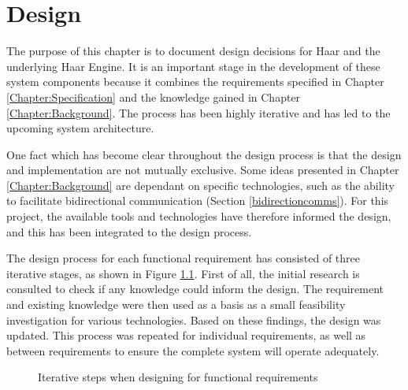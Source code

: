 \chapter{Design}
   The purpose of this chapter is to document design decisions for Haar and the underlying Haar Engine. It is an important stage in the development of these system components because it combines the requirements specified in Chapter \ref{Chapter:Specification} and the knowledge gained in Chapter \ref{Chapter:Background}. The process has been highly iterative and has led to the upcoming system architecture. 

   One fact which has become clear throughout the design process is that the design and implementation are not mutually exclusive. Some ideas presented in Chapter \ref{Chapter:Background} are dependant on specific technologies, such as the ability to facilitate bidirectional communication (Section \ref{bidirectioncomms}). For this project, the available tools and technologies have therefore informed the design, and this has been integrated to the design process.

   The design process for each functional requirement has consisted of three iterative stages, as shown in Figure \ref{figure:design-process}. First of all, the initial research is consulted to check if any knowledge could inform the design. The requirement and existing knowledge were then used as a basis as a small feasibility investigation for various technologies. Based on these findings, the design was updated. This process was repeated for individual requirements, as well as between requirements to ensure the complete system will operate adequately.

   \begin{figure}
    \centering
    \caption{Iterative steps when designing for functional requirements}\label{figure:design-process}
  \end{figure}

